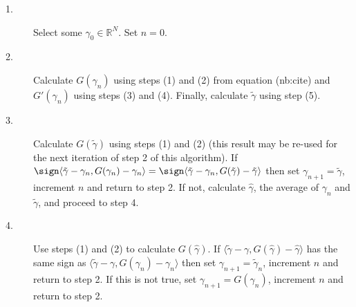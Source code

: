 \documentclass{article}
\begin{document}
\begin{description}
\item[1.] Select some $\gamma_0 \in \mathbb{R}^N$. Set $n=0$.
\item[2.] Calculate $G(\gamma_n)$ using steps (1) and (2) from equation (nb:cite) and $G'(\gamma_n)$ using steps (3) and (4).
Finally, calculate $\tilde{\gamma}$ using step (5).
\item[3.] Calculate $G(\tilde{\gamma})$ using steps (1) and (2) (this result may be re-used for the next iteration of step 2 of this algorithm).
If $\sign \langle \tilde{\gamma}-\gamma_n, G(\gamma_n)-\gamma_n \rangle = \sign \langle \tilde{\gamma}-\gamma_n, G(\tilde{\gamma})-\tilde{\gamma} \rangle$ then set $\gamma_{n+1}=\tilde{\gamma}$, increment $n$ and return to step 2.
If not, calculate $\hat{\gamma}$, the average of $\gamma_n$ and $\tilde{\gamma}$, and proceed to step 4.
\item[4.] Use steps (1) and (2) to calculate $G(\hat{\gamma})$.
If $\langle \tilde{\gamma}-\gamma, G(\hat{\gamma})-\hat{\gamma} \rangle$ has the same sign as $\langle \tilde{\gamma}-\gamma, G(\gamma_n) - \gamma_n \rangle$ then set $\gamma_{n+1} = \tilde{\gamma}_n$, increment $n$ and return to step 2.
If this is not true, set $\gamma_{n+1} = G(\gamma_n)$, increment $n$ and return to step 2.
\end{description}



\end{document}
